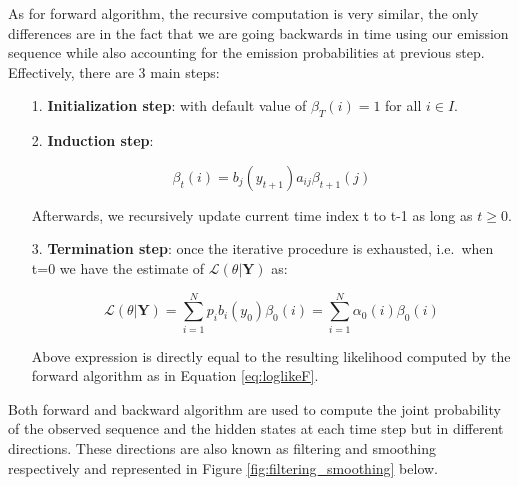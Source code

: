 As for forward algorithm, the recursive computation is very similar, the only differences are in the fact that we are going backwards in time using our emission sequence 
while also accounting for the emission probabilities at previous step. Effectively, there are 3 main steps:

\begin{itemize}
\item[1.] \textbf{Initialization step}: with default value of $\beta_T(i) = 1$ for all $i \in I$. 
\item[2.] \textbf{Induction step}: 

\begin{equation}
\beta_t(i) = b_j(y_{t+1})a_{ij} \beta_{t+1}(j)
\end{equation}

Afterwards, we recursively update current time index t to t-1 as long as $t \geq 0$.

\item[3.] \textbf{Termination step}: once the iterative procedure is exhausted, i.e.\ when t=0 we have the estimate of $\mathcal{L}(\theta| \textbf{Y})$ as:

\begin{equation}
    \mathcal{L}(\theta| \textbf{Y}) = \sum_{i=1}^N p_{i} b_i(y_{0}) \beta_{0}(i) = \sum_{i=1}^N \alpha_0(i) \beta_{0}(i)
\end{equation}

Above expression is directly equal to the resulting likelihood computed by the forward algorithm as in Equation \ref{eq:loglikeF}.

\end{itemize}

Both forward and backward algorithm are used to compute the joint probability of the observed sequence and the hidden states at each time step but in different directions.
These directions are also known as filtering and smoothing respectively and represented in Figure \ref{fig:filtering_smoothing} below.

